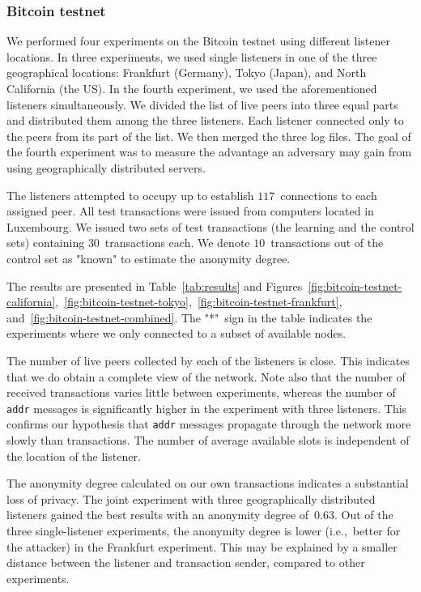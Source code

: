 \subsubsection{Bitcoin testnet}

We performed four experiments on the Bitcoin testnet using different listener locations.
In three experiments, we used single listeners in one of the three geographical locations: Frankfurt (Germany), Tokyo (Japan), and North California (the US).
In the fourth experiment, we used the aforementioned listeners simultaneously.
We divided the list of live peers into three equal parts and distributed them among the three listeners.
Each listener connected only to the peers from its part of the list.
We then merged the three log files.
The goal of the fourth experiment was to measure the advantage an adversary may gain from using geographically distributed servers.

The listeners attempted to occupy up to establish $117$~connections to each assigned peer.
All test transactions were issued from computers located in Luxembourg.
We issued two sets of test transactions (the learning and the control sets) containing $30$~transactions each.
We denote $10$~transactions out of the control set as "known" to estimate the anonymity degree.

The results are presented in Table~\ref{tab:results} and Figures~\ref{fig:bitcoin-testnet-california},~\ref{fig:bitcoin-testnet-tokyo},~\ref{fig:bitcoin-testnet-frankfurt}, and~\ref{fig:bitcoin-testnet-combined}.
The "*"~sign in the table indicates the experiments where we only connected to a subset of available nodes.

The number of live peers collected by each of the listeners is close.
This indicates that we do obtain a complete view of the network.
Note also that the number of received transactions varies little between experiments, whereas the number of \texttt{addr} messages is significantly higher in the experiment with three listeners.
This confirms our hypothesis that \texttt{addr} messages propagate through the network more slowly than transactions.
The number of average available slots is independent of the location of the listener.

The anonymity degree calculated on our own transactions indicates a substantial loss of privacy.
The joint experiment with three geographically distributed listeners gained the best results with an anonymity degree of~$0.63$.
Out of the three single-listener experiments, the anonymity degree is lower (i.e.,~better for the attacker) in the Frankfurt experiment.
This may be explained by a smaller distance between the listener and transaction sender, compared to other experiments.


